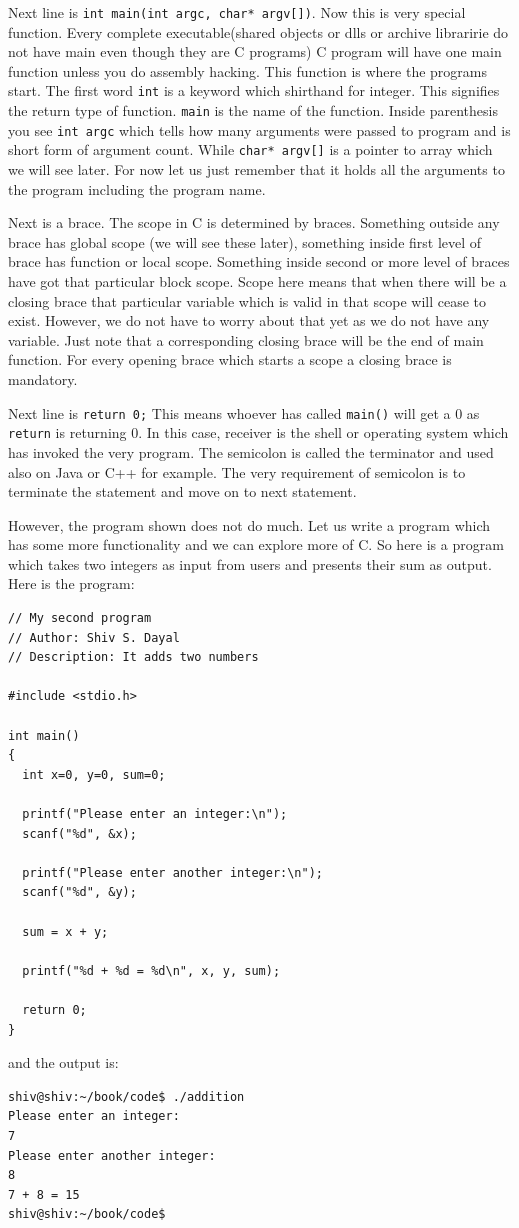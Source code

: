 Next line is \texttt{int main(int argc, char* argv[])}. Now this is very special
function. Every complete executable(shared objects or dlls or archive
libraririe do not have main even though they are C programs) C program will
have one main function unless you do assembly hacking. This function is where
the programs start. The first word \texttt{int} is a keyword which shirthand
for integer. This signifies the return type of function. \texttt{main} is the
name of the function. Inside parenthesis you see \texttt{int argc} which tells
how many arguments were passed to program and is short form of argument
count. While \texttt{char* argv[]} is a pointer to array which we will see
later. For now let us just remember that it holds all the arguments to the
program including the program name.

Next is a brace. The scope in C is determined by braces. Something outside any
brace has global scope (we will see these later), something inside first level
of brace has function or local scope. Something inside second or more level of
braces have got that particular block scope. Scope here means that when there
will be a closing brace that particular variable which is valid in that scope
will cease to exist. However, we do not have to worry about that yet as we do
not have any variable. Just note that a corresponding closing brace will be the
end of main function. For every opening brace which starts a scope a closing
brace is mandatory.

Next line is \texttt{return 0;} This means whoever has called \texttt{main()}
will get a 0 as \texttt{return} is returning 0. In this case, receiver is the
shell or operating system 
which has invoked the very program. The semicolon is called the terminator and
used also on Java or C++ for example. The very requirement of semicolon is to
terminate the statement and move on to next statement.

However, the program shown does not do much. Let us write a program which has
some more functionality and we can explore more of C. So here is a program
which takes two integers as input from users and presents their sum as
output. Here is the program:

\begin{Verbatim}[frame=single]
// My second program
// Author: Shiv S. Dayal
// Description: It adds two numbers

#include <stdio.h>

int main()
{
  int x=0, y=0, sum=0;

  printf("Please enter an integer:\n");
  scanf("%d", &x);

  printf("Please enter another integer:\n");
  scanf("%d", &y);

  sum = x + y;

  printf("%d + %d = %d\n", x, y, sum);

  return 0;
}
\end{Verbatim}
and the output is:
\begin{Verbatim}[frame=single]
shiv@shiv:~/book/code$ ./addition
Please enter an integer:
7
Please enter another integer:
8
7 + 8 = 15
shiv@shiv:~/book/code$
\end{Verbatim}

